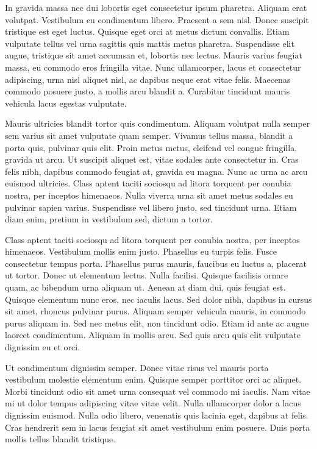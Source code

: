 In gravida massa nec dui lobortis eget consectetur ipsum pharetra. Aliquam erat volutpat. Vestibulum eu condimentum
libero. Praesent a sem nisl. Donec suscipit tristique est eget luctus. Quisque eget orci at metus dictum convallis.
Etiam vulputate tellus vel urna sagittis quis mattis metus pharetra. Suspendisse elit augue, tristique sit amet accumsan
et, lobortis nec lectus. Mauris varius feugiat massa, eu commodo eros fringilla vitae. Nunc ullamcorper, lacus et
consectetur adipiscing, urna nisl aliquet nisl, ac dapibus neque erat vitae felis. Maecenas commodo posuere justo, a
mollis arcu blandit a. Curabitur tincidunt mauris vehicula lacus egestas vulputate.

Mauris ultricies blandit tortor quis condimentum. Aliquam volutpat nulla semper sem varius sit amet vulputate quam
semper. Vivamus tellus massa, blandit a porta quis, pulvinar quis elit. Proin metus metus, eleifend vel congue
fringilla, gravida ut arcu. Ut suscipit aliquet est, vitae sodales ante consectetur in. Cras felis nibh, dapibus commodo
feugiat at, gravida eu magna. Nunc ac urna ac arcu euismod ultricies. Class aptent taciti sociosqu ad litora torquent
per conubia nostra, per inceptos himenaeos. Nulla viverra urna sit amet metus sodales eu pulvinar sapien varius.
Suspendisse vel libero justo, sed tincidunt urna. Etiam diam enim, pretium in vestibulum sed, dictum a tortor.

Class aptent taciti sociosqu ad litora torquent per conubia nostra, per inceptos himenaeos. Vestibulum mollis enim
justo. Phasellus eu turpis felis. Fusce consectetur tempus porta. Phasellus purus mauris, faucibus eu luctus a, placerat
ut tortor. Donec ut elementum lectus. Nulla facilisi. Quisque facilisis ornare quam, ac bibendum urna aliquam ut. Aenean
at diam dui, quis feugiat est. Quisque elementum nunc eros, nec iaculis lacus. Sed dolor nibh, dapibus in cursus sit
amet, rhoncus pulvinar purus. Aliquam semper vehicula mauris, in commodo purus aliquam in. Sed nec metus elit, non
tincidunt odio. Etiam id ante ac augue laoreet condimentum. Aliquam in mollis arcu. Sed quis arcu quis elit vulputate
dignissim eu et orci.

Ut condimentum dignissim semper. Donec vitae risus vel mauris porta vestibulum molestie elementum enim. Quisque semper
porttitor orci ac aliquet. Morbi tincidunt odio sit amet urna consequat vel commodo mi iaculis. Nam vitae mi ut dolor
tempus adipiscing vitae vitae velit. Nulla ullamcorper dolor a lacus dignissim euismod. Nulla odio libero, venenatis
quis lacinia eget, dapibus at felis. Cras hendrerit sem in lacus feugiat sit amet vestibulum enim posuere. Duis porta
mollis tellus blandit tristique.

